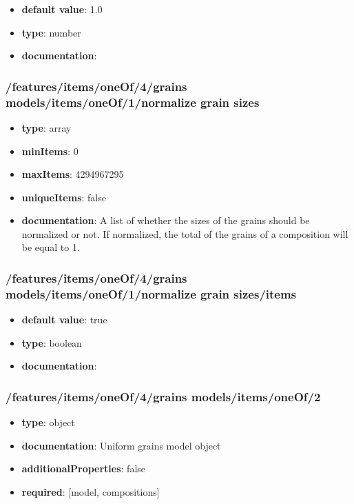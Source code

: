 \begin{itemize}\item {\bf default value}: 1.0
\item {\bf type}: number
\item {\bf documentation}: 
\end{itemize}\subsubsection{/features/items/oneOf/4/grains models/items/oneOf/1/normalize grain sizes}
\begin{itemize}\item {\bf type}: array
\item {\bf minItems}: 0
\item {\bf maxItems}: 4294967295
\item {\bf uniqueItems}: false
\item {\bf documentation}: A list of whether the sizes of the grains should be normalized or not. If normalized, the total of the grains of a composition will be equal to 1.
\end{itemize}\subsubsection{/features/items/oneOf/4/grains models/items/oneOf/1/normalize grain sizes/items}
\begin{itemize}\item {\bf default value}: true
\item {\bf type}: boolean
\item {\bf documentation}: 
\end{itemize}\subsubsection{/features/items/oneOf/4/grains models/items/oneOf/2}
\begin{itemize}\item {\bf type}: object
\item {\bf documentation}: Uniform grains model object
\item {\bf additionalProperties}: false
\item {\bf required}: [model, compositions]\end{itemize}
